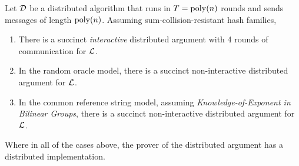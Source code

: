 \begin{theorem}
    Let $\mathcal{D}$ be a distributed algorithm that runs in $T = \operatorname{poly}(n)$ rounds and sends messages of length $\operatorname{poly}(n)$. Assuming sum-collision-resistant hash families,
    \begin{enumerate}
        \item There is a succinct \emph{interactive} distributed argument with 4 rounds of communication for $\mathcal{L}$. 
        \item In the random oracle model, there is a succinct non-interactive distributed argument for $\mathcal{L}$.
        \item In the common reference string model, assuming \emph{Knowledge-of-Exponent in Bilinear Groups}, there is a succinct non-interactive distributed argument for $\mathcal{L}$. 
    \end{enumerate}
    Where in all of the cases above, the prover of the distributed argument has a distributed implementation.
\end{theorem}